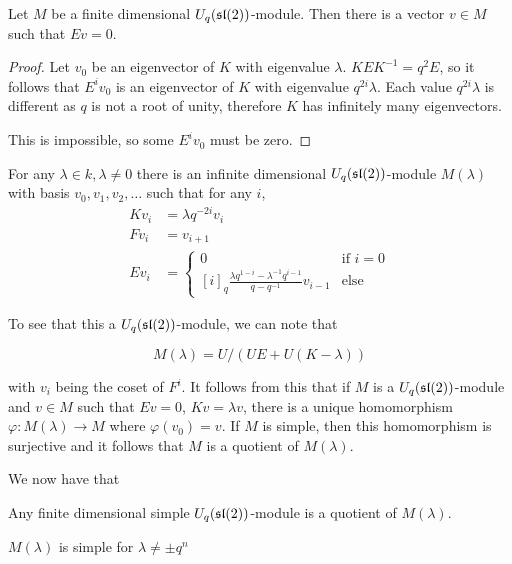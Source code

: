 \begin{claim}
    Let $M$ be a finite dimensional $U_q(\mathfrak{sl}(2))$-module. Then there is a
    vector $v \in M$ such that $Ev = 0$. 
\end{claim}

\begin{proof}
    Let $v_0$ be an eigenvector of $K$ with eigenvalue $\lambda$. $KEK^{-1} =
    q^2 E$, so it follows that $E^i v_0$ is an eigenvector of $K$ with
    eigenvalue $q^{2i}\lambda$. Each value $q^{2i}\lambda$ is different as $q$
    is not a root of unity, therefore $K$ has infinitely many eigenvectors. 

    This is impossible, so some $E^i v_0$ must be zero.
\end{proof}

For any $\lambda \in k, \lambda \neq 0$ there is an infinite dimensional
$U_q(\mathfrak{sl}(2))$-module $M(\lambda)$ with basis $v_0, v_1, v_2, \ldots$ such that
for any $i$,
\begin{align}
    Kv_i &= \lambda q^{-2i}v_i \\
    Fv_i &= v_{i+1} \\
    Ev_i &= \begin{cases} 0 & \text{if $i = 0$} \\
                          [i]_q \frac{\lambda q^{1-i} - \lambda^{-1}q^{i-1}}{q - q^{-1}}v_{i-1} & \text{else}
            \end{cases}
\end{align}

To see that this a $U_q(\mathfrak{sl}(2))$-module, we can note that 

\begin{equation}
    M(\lambda) = U/(UE + U(K-\lambda))
\end{equation}

with $v_i$ being the coset of $F^i$. It follows from this that if $M$ is a
$U_q(\mathfrak{sl}(2))$-module and $v \in M$ such that $Ev = 0$, $Kv = \lambda v$, there
is a unique homomorphism $\varphi: M(\lambda) \to M$ where $\varphi(v_0) = v$.
If $M$ is simple, then this homomorphism is surjective and it follows that $M$
is a quotient of $M(\lambda)$. 

We now have that 
\begin{claim}
    Any finite dimensional simple $U_q(\mathfrak{sl}(2))$-module is a quotient of $M(\lambda)$.
\end{claim}

\begin{claim}
    $M(\lambda)$ is simple for $\lambda \neq \pm q^n$
\end{claim}

